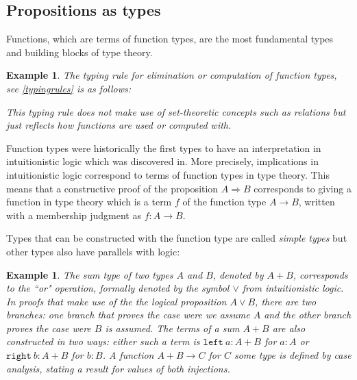 \documentclass[12pt,a4paper,twoside,xetex]{book}
\newcommand{\keyword}[1]{\emph{#1}\index{#1}}
\newtheorem{example}[theorem]{Example}
\begin{document}
\subsection{Propositions as types}\label{curryhoward}

Functions, which are terms of function types, are the most fundamental types and building blocks of type theory. 

\begin{example}
The typing rule for elimination or computation of function types, see \cref{typingrules} is as follows:
\begin{prooftree}
    \end{prooftree}
This typing rule does not make use of set-theoretic concepts such as relations but just reflects how functions are used or computed with.
\end{example}
    
    
Function types were historically the first types to have an interpretation in intuitionistic logic \cite{Heyting1930} which was discovered in\cite{Curry1934Nov}. More precisely, implications in intuitionistic logic correspond to terms of function types in type theory. This means that a constructive proof of the proposition $A \Rightarrow B$ corresponds to giving a function  in type theory which is a term $f$ of the function type $ A \rightarrow B$, written with a membership judgment as $f: A \rightarrow B$. 

Types that can be constructed with the function type are called \keyword{simple types} but other types also have parallels with logic:

\begin{example}
The \keyword{sum type} of two types $A$ and $B$, denoted by $A+B$, corresponds to the ``or" operation, formally denoted by the symbol $\vee$ from intuitionistic logic. In proofs that make use of the the logical proposition $A \vee B$, there are two branches: one branch that proves the case were we assume $A$ and the other branch proves the case were $B$ is assumed. The terms of a sum $A+B$ are also constructed in two ways: either such a term is $\texttt{left}\ a:A+B$ for $a:A$ or $\texttt{right}\ b:A+B$ for $b:B$. A function $A+B\rightarrow C$ for $C$ some type is defined by case analysis, stating a result for values of both injections.
\end{example}
\end{document}
